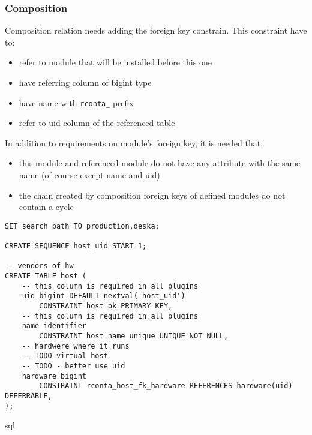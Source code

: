 \documentclass[deska]{subfiles}
\begin{document}
\subsubsection{Composition}
Composition relation needs adding the foreign key constrain. This constraint have to:
\begin{itemize}
    \item refer to module that will be installed before this one
    \item have referring column of bigint type
    \item have name with {\tt rconta\_} prefix
    \item refer to uid column of the referenced table
\end{itemize}
In addition to requirements on module's foreign key, it is needed that:
\begin{itemize}
    \item this module and referenced module do not have any attribute with the same name (of course except name and uid)
    \item the chain created by composition foreign keys of defined modules do not contain a cycle
\end{itemize}

\begin{verbatim}
SET search_path TO production,deska;

CREATE SEQUENCE host_uid START 1;

-- vendors of hw
CREATE TABLE host (
    -- this column is required in all plugins
    uid bigint DEFAULT nextval('host_uid')
        CONSTRAINT host_pk PRIMARY KEY,
    -- this column is required in all plugins
    name identifier
        CONSTRAINT host_name_unique UNIQUE NOT NULL,
    -- hardwere where it runs
    -- TODO-virtual host
    -- TODO - better use uid
    hardware bigint
        CONSTRAINT rconta_host_fk_hardware REFERENCES hardware(uid) DEFERRABLE,
);
\end{verbatim}{sql}
\end{document}
